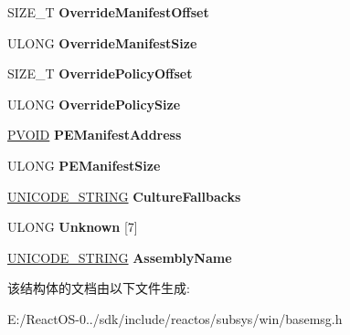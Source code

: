 \begin{DoxyCompactItemize}
\mbox{\label{struct___b_a_s_e___s_x_s___c_r_e_a_t_e_p_r_o_c_e_s_s___m_s_g_ae792e5ccd3e28b8d2499a5174de0630e}} 
S\+I\+Z\+E\+\_\+T {\bfseries Override\+Manifest\+Offset}
\item 
\mbox{\label{struct___b_a_s_e___s_x_s___c_r_e_a_t_e_p_r_o_c_e_s_s___m_s_g_a2f99883135655b753d25e34c762e546f}} 
U\+L\+O\+NG {\bfseries Override\+Manifest\+Size}
\item 
\mbox{\label{struct___b_a_s_e___s_x_s___c_r_e_a_t_e_p_r_o_c_e_s_s___m_s_g_a5854acdbb5a4d93c416e4625fd8b67a9}} 
S\+I\+Z\+E\+\_\+T {\bfseries Override\+Policy\+Offset}
\item 
\mbox{\label{struct___b_a_s_e___s_x_s___c_r_e_a_t_e_p_r_o_c_e_s_s___m_s_g_a24595fddc6e6062b75a996ec0989208b}} 
U\+L\+O\+NG {\bfseries Override\+Policy\+Size}
\item 
\mbox{\label{struct___b_a_s_e___s_x_s___c_r_e_a_t_e_p_r_o_c_e_s_s___m_s_g_a89e5ae2f90c380e12a3252e2aa8c9742}} 
\hyperlink{interfacevoid}{P\+V\+O\+ID} {\bfseries P\+E\+Manifest\+Address}
\item 
\mbox{\label{struct___b_a_s_e___s_x_s___c_r_e_a_t_e_p_r_o_c_e_s_s___m_s_g_a587e3a314bbfef1ed307625811f8d784}} 
U\+L\+O\+NG {\bfseries P\+E\+Manifest\+Size}
\item 
\mbox{\label{struct___b_a_s_e___s_x_s___c_r_e_a_t_e_p_r_o_c_e_s_s___m_s_g_ab489650ca9f0cf8d3ef4bd31599ebd0d}} 
\hyperlink{struct___u_n_i_c_o_d_e___s_t_r_i_n_g}{U\+N\+I\+C\+O\+D\+E\+\_\+\+S\+T\+R\+I\+NG} {\bfseries Culture\+Fallbacks}
\item 
\mbox{\label{struct___b_a_s_e___s_x_s___c_r_e_a_t_e_p_r_o_c_e_s_s___m_s_g_ab58ea10574abb0a1a345236e3b8d0b36}} 
U\+L\+O\+NG {\bfseries Unknown} \mbox{[}7\mbox{]}
\item 
\mbox{\label{struct___b_a_s_e___s_x_s___c_r_e_a_t_e_p_r_o_c_e_s_s___m_s_g_aff426392d0bc21caff044c7fc346d7dd}} 
\hyperlink{struct___u_n_i_c_o_d_e___s_t_r_i_n_g}{U\+N\+I\+C\+O\+D\+E\+\_\+\+S\+T\+R\+I\+NG} {\bfseries Assembly\+Name}
\end{DoxyCompactItemize}


该结构体的文档由以下文件生成\+:\begin{DoxyCompactItemize}
\item 
E\+:/\+React\+O\+S-\/0../sdk/include/reactos/subsys/win/basemsg.\+h\end{DoxyCompactItemize}
